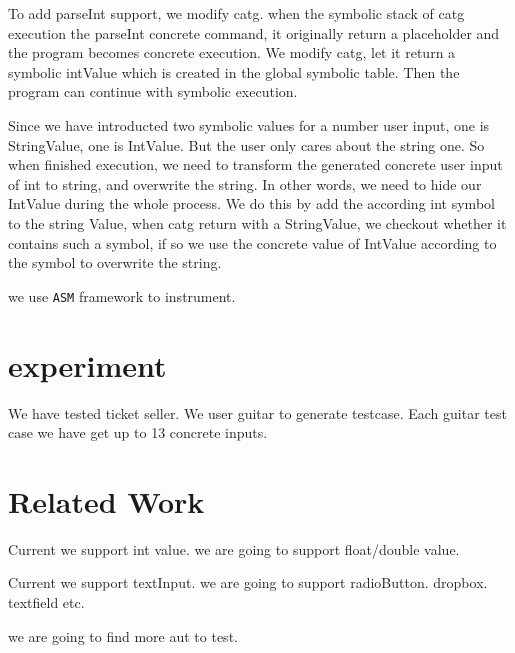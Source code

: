 \documentclass{article}
\begin{document}
To add parseInt support, we modify catg. when the symbolic stack of catg execution the parseInt concrete command, it originally return a placeholder and the program becomes concrete execution. We modify catg, let it return a symbolic intValue which is created in the global symbolic table. Then the program can continue with symbolic execution.

Since we have introducted two symbolic values for a number user input, one is StringValue, one is IntValue. But the user only cares about the string one. So when finished execution, we need to transform the generated concrete user input of int to string, and overwrite the string. In other words, we need to hide our IntValue during the whole process. We do this by add the according int symbol to the string Value, when catg return with a StringValue, we checkout whether it contains such a symbol, if so we use the concrete value of IntValue according to the symbol to overwrite the string.


we use \texttt{ASM} framework to instrument.

\section{experiment}
We have tested ticket seller. We user guitar to generate testcase. Each guitar test case we have get up to 13 concrete inputs.


\section{Related Work}\label{section:relatedwork}
Current we support int value.
we are going to support float/double value.

Current we support textInput.
we are going to support radioButton. dropbox. textfield etc.

we are going to find more aut to test.




\end{document}
